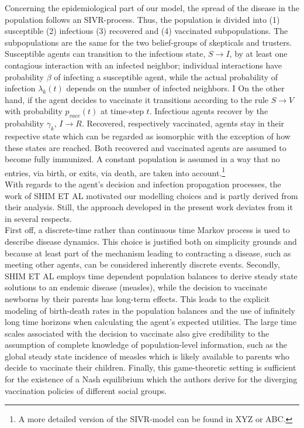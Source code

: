 \documentclass[11pt]{article}
\begin{document}
Concerning the epidemiological part of our model, the spread of the disease in the population follows an SIVR-process. Thus, the population is divided into (1) susceptible (2) infectious (3) recovered and (4) vaccinated subpopulations. The subpopulations are the same for the two belief-groups of skepticals and trusters. Susceptible agents can transition to the infectious state, \(S \rightarrow{} I \), by at least one contagious interaction with an infected neighbor; individual interactions have probability \(\beta\) of infecting a susceptible agent, while the actual probability of infection \(\lambda_{k}(t)\) depends on the number of infected neighbors. I On the other hand, if the agent decides to vaccinate it transitions according to the rule \(S \rightarrow{} V \) with probability \(p_{vacc}(t)\) at time-step \(t\). Infectious agents recover by the probability \(\gamma_{k}\), \(I \rightarrow{} R\). Recovered, respectively vaccinated, agents stay in their respective state which can be regarded as isomorphic with the exception of how these states are reached. Both recovered and vaccinated agents are assumed to become fully immunized. A constant population is assumed in a way that no entries, via birth, or exits, via death, are taken into account.\footnote{A more detailed version of the SIVR-model can be found in XYZ or ABC.}\\
With regards to the agent's decision and infection propagation processes, the work of SHIM ET AL motivated our modelling choices and is partly derived from their analysis. Still, the approach developed in the present work deviates from it in several respects.\\
First off, a discrete-time rather than continuous time Markov process is used to describe disease dynamics. This choice is justified both on simplicity grounds and because at least part of the mechanism leading to contracting a disease, such as meeting other agents, can be considered inherently discrete events. Secondly, SHIM ET AL employs time dependent population balances to derive steady state solutions to an endemic disease (measles), while the decision to vaccinate newborns by their parents has long-term effects. This leads to the explicit modeling of birth-death rates in the population balances and the use of infinitely long time horizons when calculating the agent's expected utilities. The large time scales associated with the decision to vaccinate also give credibility to the assumption of complete knowledge of population-level information, such as the global steady state incidence of measles which is likely available to parents who decide to vaccinate their children. Finally, this game-theoretic setting is sufficient for the existence of a Nash equilibrium which the authors derive for the diverging vaccination policies of different social groups.\\
\end{document}
